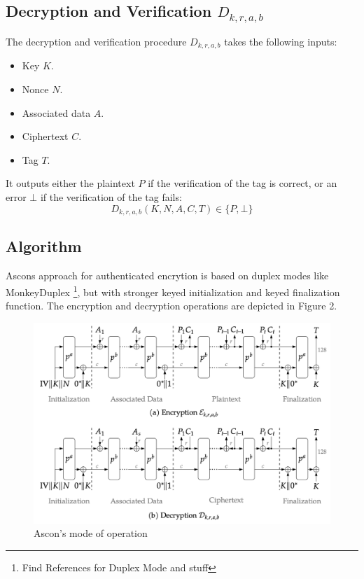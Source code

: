 \subsection{Decryption and Verification $D_{k,r,a,b}$}
The decryption and verification procedure $D_{k,r,a,b}$ takes the following inputs:
\begin{itemize}
    \item Key $K$.
    \item Nonce $N$.
    \item Associated data $A$.
    \item Ciphertext $C$.
    \item Tag $T$.
\end{itemize}
It outputs either the plaintext $P$ if the verification of the tag is correct, or an error $\bot$ if the verification of the tag fails:
\[
D_{k,r,a,b}(K,N,A,C,T) \in \{P, \bot\}
\]
\cite{Ascon-v1.2}

\subsection{Algorithm} %
Ascons approach for authenticated encrytion is based on duplex modes like MonkeyDuplex \footnote[3]{Find References for Duplex Mode and stuff}, but with stronger keyed initialization and keyed finalization function. The encryption and decryption operations are depicted in Figure 2. \cite{Ascon-v1.2}
\begin{figure}[H]
    \centering
    \includegraphics[width=1\textwidth]{figures/aead-algorithm.png}
    \caption{Ascon's mode of operation \cite{Ascon-v1.2}}
    \label{fig:aead-algorithm}
\end{figure}
